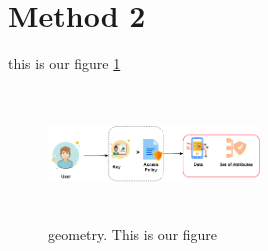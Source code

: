 \documentclass[12pt]{article}
\begin{document}
\section{Method 2}
this is our figure \ref{fig:2.14}
\begin{figure}[h]
  \centering
  \includegraphics[width=0.5\textwidth,height=3.5cm]{images/2.333.pdf}
  \caption{geometry. This is our figure}
  \label{fig:2.14}

\end{figure}
\end{document}
